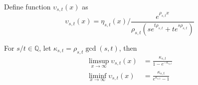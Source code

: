 \documentclass[]{article}
\begin{document}
\vspace{1cm}
\begin{definition}
Define function $\upsilon_{s,t}(x)$ as
\[
\upsilon_{s,t}(x) =  \eta_{s,t}(x) \big/ \frac{e^{\rho_{s,t} x}}{\rho_{s,t}(s e^{t\rho_{s,t}} + te^{s\rho_{s,t}})}
\]
\end{definition}


\vspace{1cm}
\begin{lemma}
	For $s/t\in\mathbb{Q}$, let $\kappa_{s,t} = \rho_{s,t} \gcd(s, t)$, then
	\begin{align*}
	\limsup_{x\to\infty} \upsilon_{s,t}(x) &= \frac{\kappa_{s,t}}{1 - e^{-\kappa_{s,t}}} \\
	\liminf_{x\to\infty} \upsilon_{s,t}(x) &= \frac{\kappa_{s,t}}{e^{\kappa_{s,t}} - 1}
	\end{align*}
\end{lemma}
\end{document}
